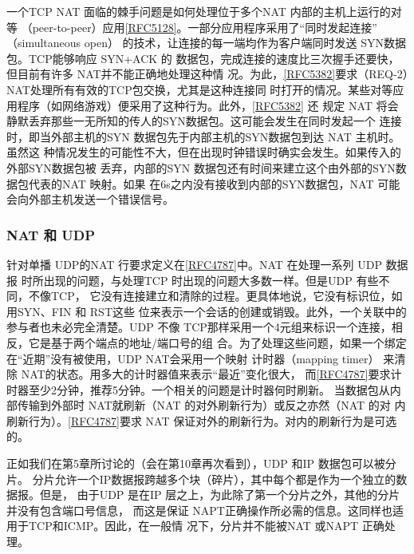 一个TCP NAT 面临的棘手问题是如何处理位于多个NAT 内部的主机上运行的对等
（peer-to-peer）应用\href{https://www.rfc-editor.org/rfc/rfc5128}{[RFC5128]}。一部分应用程序采用了“同时发起连接”
（simultaneous open）
的技术，让连接的每一端均作为客户端同时发送 SYN数据包。TCP能够响应 SYN+ACK 的
数据包，完成连接的速度比三次握手还要快，但目前有许多 NAT并不能正确地处理这种情
况。为此，\href{https://www.rfc-editor.org/rfc/rfc5382}{[RFC5382]}要求（REQ-2）NAT处理所有有效的TCP包交换，尤其是这种连接同
时打开的情况。某些对等应用程序（如网络游戏）便采用了这种行为。此外，\href{https://www.rfc-editor.org/rfc/rfc5382}{[RFC5382]}
还
规定 NAT 将会静默丢弃那些一无所知的传人的SYN数据包。这可能会发生在同时发起一个
连接时，即当外部主机的SYN 数据包先于内部主机的SYN数据包到达 NAT 主机时。虽然这
种情况发生的可能性不大，但在出现时钟错误时确实会发生。如果传入的外部SYN数据包被
丢弃，内部的SYN 数据包还有时间来建立这个由外部的SYN数据包代表的NAT 映射。如果
在6s之内没有接收到内部的SYN数据包，NAT 可能会向外部主机发送一个错误信号。

\subsubsection{NAT 和 UDP}

针对单播 UDP的NAT
行要求定义在\href{https://www.rfc-editor.org/rfc/rfc4787}{[RFC4787]}中。NAT
在处理一系列 UDP 数据报
时所出现的问题，与处理TCP 时出现的问题大多数一样。但是UDP 有些不同，不像TCP，
它没有连接建立和清除的过程。更具体地说，它没有标识位，如用SYN、FIN 和 RST这些
位来表示一个会话的创建或销毁。此外，一个关联中的参与者也未必完全清楚。UDP 不像
TCP那样采用一个4元组来标识一个连接，相反，它是基于两个端点的地址/端口号的组
合。为了处理这些问题，如果一个绑定在“近期”没有被使用，UDP NAT会采用一个映射
计时器（mapping timer） 来清除 NAT的状态。用多大的计时器值来表示“最近”变化很大，
而\href{https://www.rfc-editor.org/rfc/rfc4787}{[RFC4787]}要求计时器至少2分钟，推荐5分钟。一个相关的问题是计时器何时刷新。
当数据包从内部传输到外部时 NAT就刷新（NAT 的对外刷新行为）或反之亦然（NAT 的对
内刷新行为）。\href{https://www.rfc-editor.org/rfc/rfc4787}{[RFC4787]}要求 NAT
保证对外的刷新行为。对内的刷新行为是可选的。

正如我们在第5章所讨论的（会在第10章再次看到），UDP 和IP 数据包可以被分片。
分片允许一个IP数据报跨越多个块（碎片），其中每个都是作为一个独立的数据报。但是，
由于UDP 是在IP 层之上，为此除了第一个分片之外，其他的分片并没有包含端口号信息，
而这是保证 NAPT正确操作所必需的信息。这同样也适用于TCP和ICMP。因此，在一般情
况下，分片并不能被NAT 或NAPT 正确处理。

